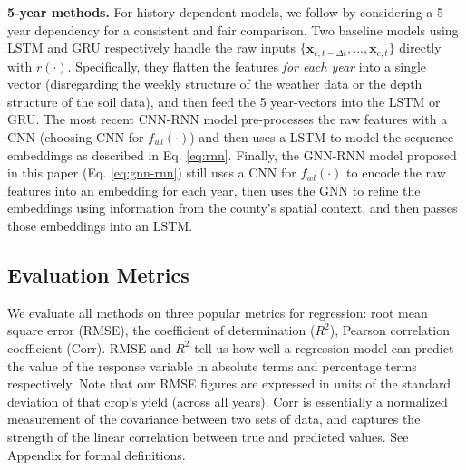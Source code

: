 \textbf{5-year methods.} For history-dependent models, we follow \cite{khaki2020cnn} by considering a 5-year dependency for a consistent and fair comparison. Two baseline models using LSTM and GRU respectively handle the raw inputs $\{\mathbf{x}_{c,t-\Delta t}, ...,\mathbf{x}_{c,t}\}$ directly with $r(\cdot)$. Specifically, they flatten the features \emph{for each year} into a single vector (disregarding the weekly structure of the weather data or the depth structure of the soil data), and then feed the 5 year-vectors into the LSTM or GRU. The most recent CNN-RNN model \cite{khaki2020cnn} pre-processes the raw features with a CNN (choosing CNN for $f_{wl}(\cdot)$) and then uses a LSTM to model the sequence embeddings as described in Eq. \ref{eq:rnn}. Finally, the GNN-RNN model proposed in this paper (Eq. \ref{eq:gnn-rnn}) still uses a CNN for $f_{wl}(\cdot)$ to encode the raw features into an embedding for each year, then uses the GNN to refine the embeddings using information from the county's spatial context, and then passes those embeddings into an LSTM.



\subsection{Evaluation Metrics}
We evaluate all methods on three popular metrics for regression: root mean square error (RMSE), the coefficient of determination ($R^2$), Pearson correlation coefficient (Corr). RMSE and $R^2$ tell us how well a regression model can predict the value of the response variable in absolute terms and percentage terms respectively. Note that our RMSE figures are expressed in units of the standard deviation of that crop's yield (across all years). Corr is essentially a normalized measurement of the covariance between two sets of data, and captures the strength of the linear correlation between true and predicted values. See Appendix for formal definitions.


